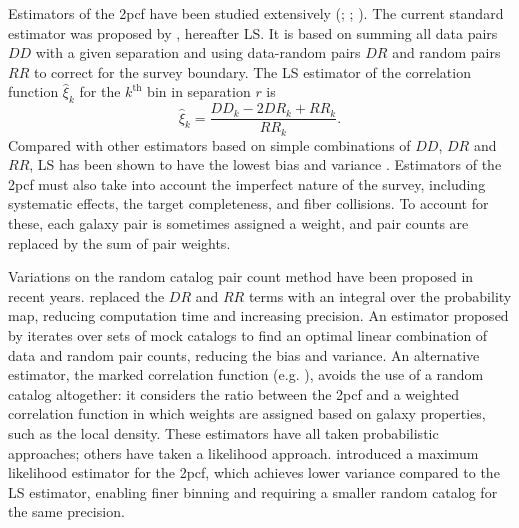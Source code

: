 \documentclass[modern]{aastex62}
\newcommand{\cf}{2pcf\xspace} %
\newcommand{\LS}{LS\xspace}
\begin{document}
Estimators of the \cf have been studied extensively (\citealt{PeeblesHauser1974}; \citealt{DavisPeebles1983}; \citealt{Hamilton1993}).
The current standard estimator was proposed by \cite{LandySzalay1993}, hereafter \LS. It is based on summing all data pairs $DD$ with a given separation and using data-random pairs $DR$ and random pairs $RR$ to correct for the survey boundary. The \LS estimator of the correlation function $\hat{\xi}_k$ for the $k^\mathrm{th}$ bin in separation $r$ is
\begin{equation}
\hat{\xi}_k = \frac{DD_k - 2DR_k + RR_k}{RR_k}.
\end{equation}
Compared with other estimators based on simple combinations of $DD$, $DR$ and $RR$, \LS has been shown to have the lowest bias and variance \citep{Kerscher2000}.
Estimators of the \cf must also take into account the imperfect nature of the survey, including systematic effects, the target completeness, and fiber collisions.
To account for these, each galaxy pair is sometimes assigned a weight, and pair counts are replaced by the sum of pair weights.

Variations on the random catalog pair count method have been proposed in recent years.
\cite{Demina2016} replaced the $DR$ and $RR$ terms with an integral over the probability map, reducing computation time and increasing precision.
An estimator proposed by \cite{VargasMagana2013} iterates over sets of mock catalogs to find an optimal linear combination of data and random pair counts, reducing the bias and variance.
An alternative estimator, the marked correlation function (e.g. \citealt{WhitePadmanabhan2009}), avoids the use of a random catalog altogether: it considers the ratio between the \cf and a weighted correlation function in which weights are assigned based on galaxy properties, such as the local density.
These estimators have all taken probabilistic approaches; others have taken a likelihood approach.
\cite{BaxterRozo2013} introduced a maximum likelihood estimator for the \cf, which achieves lower variance compared to the \LS estimator, enabling finer binning and requiring a smaller random catalog for the same precision.
\end{document}
